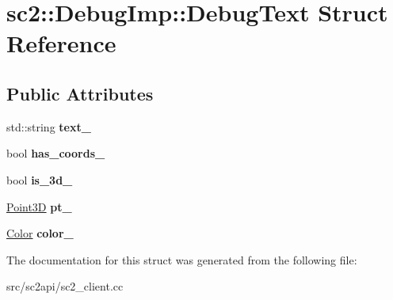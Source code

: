 \hypertarget{structsc2_1_1_debug_imp_1_1_debug_text}{}\section{sc2\+:\+:Debug\+Imp\+:\+:Debug\+Text Struct Reference}
\label{structsc2_1_1_debug_imp_1_1_debug_text}
\subsection*{Public Attributes}
\begin{DoxyCompactItemize}
\item 
\mbox{\label{structsc2_1_1_debug_imp_1_1_debug_text_aa76628803ed205f33d2545d3b391f647}} 
std\+::string {\bfseries text\+\_\+}
\item 
\mbox{\label{structsc2_1_1_debug_imp_1_1_debug_text_afec9524e21a65748d37fb37ef90f3318}} 
bool {\bfseries has\+\_\+coords\+\_\+}
\item 
\mbox{\label{structsc2_1_1_debug_imp_1_1_debug_text_a271787fe51cd65eefb406baf13f8a48d}} 
bool {\bfseries is\+\_\+3d\+\_\+}
\item 
\mbox{\label{structsc2_1_1_debug_imp_1_1_debug_text_a19429b4f3522ccd45a7912669aac109c}} 
\hyperlink{structsc2_1_1_point3_d}{Point3D} {\bfseries pt\+\_\+}
\item 
\mbox{\label{structsc2_1_1_debug_imp_1_1_debug_text_a35e990d7c34b2f9b80af9d22432c1003}} 
\hyperlink{structsc2_1_1_color}{Color} {\bfseries color\+\_\+}
\end{DoxyCompactItemize}


The documentation for this struct was generated from the following file\+:\begin{DoxyCompactItemize}
\item 
src/sc2api/sc2\+\_\+client.\+cc\end{DoxyCompactItemize}
